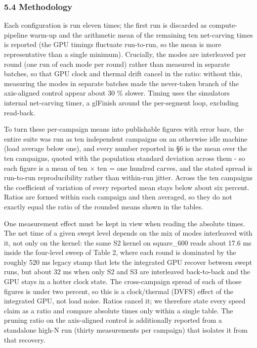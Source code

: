 \documentclass[
]{article}
\begin{document}
\hypertarget{methodology}{%
\subsubsection{5.4 Methodology}\label{methodology}}

Each configuration is run eleven times; the first run is discarded as
compute-pipeline warm-up and the arithmetic mean of the remaining ten
net-carving times is reported (the GPU timings fluctuate run-to-run, so
the mean is more representative than a single minimum). Crucially, the
modes are interleaved per round (one run of each mode per round) rather
than measured in separate batches, so that GPU clock and thermal drift
cancel in the ratio: without this, measuring the modes in separate
batches made the never-taken branch of the axis-aligned control appear
about 30 \% slower. Timing uses the simulator\textquotesingle s internal
net-carving timer, a glFinish around the per-segment loop, excluding
read-back.

To turn these per-campaign means into publishable figures with error
bars, the entire suite was run as ten independent campaigns on an
otherwise idle machine (load average below one), and every number
reported in §6 is the mean over the ten campaigns, quoted with the
population standard deviation across them - so each figure is a mean of
ten × ten = one hundred carves, and the stated spread is run-to-run
reproducibility rather than within-run jitter. Across the ten campaigns
the coefficient of variation of every reported mean stays below about
six percent. Ratios are formed within each campaign and then averaged,
so they do not exactly equal the ratio of the rounded means shown in the
tables.

One measurement effect must be kept in view when reading the absolute
times. The net time of a given swept level depends on the mix of modes
interleaved with it, not only on the kernel: the same S2 kernel on
square\_600 reads about 17.6 ms inside the four-level sweep of Table 2,
where each round is dominated by the roughly 520 ms legacy stamp that
lets the integrated GPU recover between swept runs, but about 32 ms when
only S2 and S3 are interleaved back-to-back and the GPU stays in a
hotter clock state. The cross-campaign spread of each of those figures
is under two percent, so this is a clock/thermal (DVFS) effect of the
integrated GPU, not load noise. Ratios cancel it; we therefore state
every speed claim as a ratio and compare absolute times only within a
single table. The pruning ratio on the axis-aligned control is
additionally reported from a standalone high-N run (thirty measurements
per campaign) that isolates it from that recovery.
\end{document}
